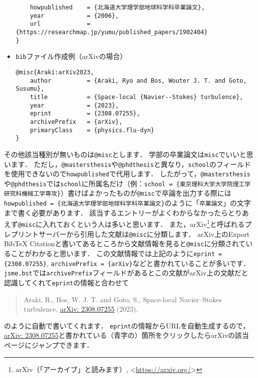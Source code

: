 \documentclass[a4paper,fleqn,uplatex,dvipdfmx]{jsarticle}
\makeatletter
\newcommand{\jsmefile}{\texttt{jsme.bst}}
\newcommand{\ttmastersthesis}{\texttt{@mastersthesis}}
\newcommand{\ttmisc}{\texttt{@misc}}
\newcommand{\ttphdthesis}{\texttt{@phdthesis}}
\makeatother
\begin{document}
\begin{screen}
\begin{itemize}
\begin{verbatim}
    howpublished    = {北海道大学理学部地球科学科卒業論文},
    year            = {2006},
    url             = {https://researchmap.jp/yumu/published_papers/1902404}
}
\end{verbatim}
        \item \verb|bib|ファイル作成例（arXivの場合） \vspace{-3mm}
\begin{verbatim}
@misc{Araki:arXiv2023,
    author          = {Araki, Ryo and Bos, Wouter J. T. and Goto, Susumu},
    title           = {Space-local {Navier--Stokes} turbulence}, 
    year            = {2023},
    eprint          = {2308.07255},
    archivePrefix   = {arXiv},
    primaryClass    = {physics.flu-dyn}
}
\end{verbatim}
    \end{itemize}
\end{screen}

その他該当種別が無いものは\ttmisc とします．
学部の卒業論文は\verb|misc|でいいと思います．
ただし，\ttmastersthesis や\ttphdthesis と異なり，\verb|school|のフィールドを使用できないので\verb|howpublished|で代用します．
したがって，\ttmastersthesis や\ttphdthesis では\verb|school|に所属名だけ（例：\verb|school = {東京理科大学大学院理工学研究科機械工学専攻}|）書けばよかったものが\ttmisc で卒論を出力する際には\verb|howpublished = {北海道大学理学部地球科学科卒業論文}|のように「\verb|卒業論文|」の文字まで書く必要があります．
該当するエントリーがよくわからなかったらとりあえず\ttmisc に入れておくという人は多いと思います．
また，arXiv\footnote{arXiv（「アーカイブ」と読みます）, \textless\url{https://arxiv.org/}\textgreater}と呼ばれるプレプリントサーバーから引用した文献は\ttmisc に分類します．
arXiv上のExport BibTeX Citationと書いてあるところから文献情報を見ると\ttmisc に分類されていることがわかると思います．
この文献情報では上記のように\verb|eprint = {2308.07255}|, \verb|archivePrefix = {arXiv}|などと書かれていることが多いです．
\jsmefile では\verb|archivePrefix|フィールドがあるとこの文献がarXiv上の文献だと認識してくれて\verb|eprint|の情報と合わせて
\begin{quote}
    Araki, R., Bos, W. J. T. and Goto, S., Space-local Navier--Stokes turbulence, \href{https://doi.org/10.48550/arXiv.2308.07255}{arXiv: 2308.07255} (2023).
\end{quote}
のように自動で書いてくれます．
\verb|eprint|の情報からURLを自動生成するので，\href{https://doi.org/10.48550/arXiv.2308.07255}{arXiv: 2308.07255}と書かれている（青字の）箇所をクリックしたらarXivの該当ページにジャンプできます．
\end{document}

